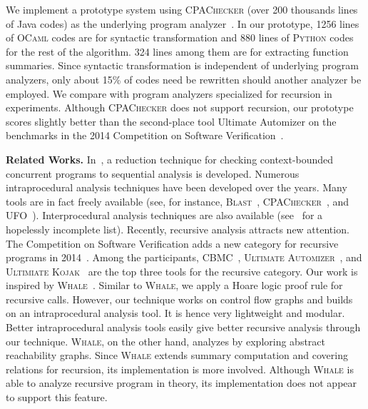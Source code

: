 We implement a prototype system using \textsc{CPAChecker} (over 200 thousands lines of Java codes) as the underlying program analyzer~\cite{BeyerK11}. In our prototype, 1256 lines of \textsc{OCaml} codes are for syntactic transformation and 880 lines of \textsc{Python} codes for the rest of the algorithm. 324 lines among them are for extracting function summaries. Since syntactic transformation is independent of underlying program analyzers, only about 15\% of codes need be rewritten should another analyzer be employed. We compare with program analyzers specialized for recursion in experiments. Although \textsc{CPAChecker} does not support recursion, our prototype scores slightly better than the second-place tool Ultimate Automizer on the benchmarks in the 2014 Competition on Software Verification~\cite{svcomp14}. 


\noindent
\textbf{Related Works.}
In~\cite{LalR08,LalR09}, a reduction technique for checking context-bounded concurrent programs to sequential analysis is developed. Numerous intraprocedural analysis techniques have been developed over the years. Many tools are in fact freely available (see, for instance, \textsc{Blast}~\cite{BeyerHJM07}, \textsc{CPAChecker}~\cite{BeyerK11}, and \textsc{UFO}~\cite{AlbarghouthiLGC12}). Interprocedural analysis techniques are also available (see~\cite{RepsHS95,BallR01,CousotCFMMMR05,CuoqKKPSY12,coverity,polyspace} for a hopelessly incomplete list). Recently, recursive analysis attracts new attention. The Competition on Software Verification adds a new category for recursive programs in 2014~\cite{svcomp14}. Among the participants, \textsc{CBMC}~\cite{ClarkeKL04}, \textsc{Ultimate Automizer}~\cite{HeizmannCDEHLNSP13}, and \textsc{Ultimiate Kojak}~\cite{Kojak} are the top three tools for the recursive category. Our work is inspired by \textsc{Whale}~\cite{AlbarghouthiGC12}. Similar to \textsc{Whale}, we apply a Hoare logic proof rule for recursive calls. However, our technique works on control flow graphs and builds on an intraprocedural analysis tool. It is hence very lightweight and modular. Better intraprocedural analysis tools easily give better recursive analysis through our technique. \textsc{Whale}, on the other hand, analyzes by exploring abstract reachability graphs. Since \textsc{Whale} extends summary computation and covering relations for recursion, its implementation is more involved. Although \textsc{Whale} is able to analyze recursive program in theory, its implementation does not appear to support this feature.

